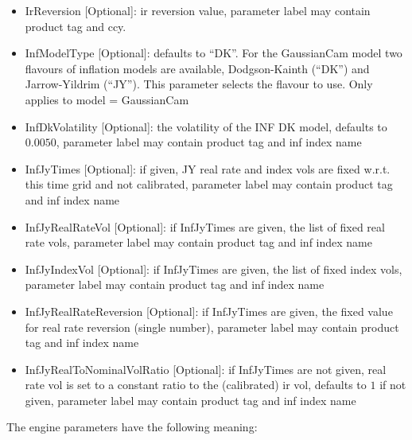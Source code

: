 \begin{itemize}
\item IrReversion [Optional]: ir reversion value, parameter label may contain product tag and ccy.
\item InfModelType [Optional]: defaults to ``DK''. For the GaussianCam model two flavours of inflation models are
  available, Dodgson-Kainth (``DK'') and Jarrow-Yildrim (``JY''). This parameter selects the flavour to use. Only applies
  to model = GaussianCam
\item InfDkVolatility [Optional]: the volatility of the INF DK model, defaults to $0.0050$, parameter label may contain
  product tag and inf index name
\item InfJyTimes [Optional]: if given, JY real rate and index vols are fixed w.r.t. this time grid and not calibrated,
  parameter label may contain product tag and inf index name
\item InfJyRealRateVol [Optional]: if InfJyTimes are given, the list of fixed real rate vols, parameter label may
  contain product tag and inf index name
\item InfJyIndexVol [Optional]: if InfJyTimes are given, the list of fixed index vols, parameter label may
  contain product tag and inf index name
\item InfJyRealRateReversion [Optional]: if InfJyTimes are given, the fixed value for real rate reversion (single
  number), parameter label may contain product tag and inf index name
\item InfJyRealToNominalVolRatio [Optional]: if InfJyTimes are not given, real rate vol is set to a constant ratio to
  the (calibrated) ir vol, defaults to $1$ if not given, parameter label may contain product tag and inf index name
\end{itemize}

The engine parameters have the following meaning:


